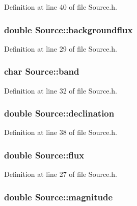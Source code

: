 Definition at line 40 of file Source.h.

\hypertarget{classSource_ac6515686d4bbb766ae14e1360fdf1c97}{
\subsubsection[{backgroundflux}]{\setlength{\rightskip}{0pt plus 5cm}double {\bf Source::backgroundflux}}}
\label{classSource_ac6515686d4bbb766ae14e1360fdf1c97}


Definition at line 29 of file Source.h.

\hypertarget{classSource_a380447fc2b80c1b6bc5c2a8b31ed6b98}{
\subsubsection[{band}]{\setlength{\rightskip}{0pt plus 5cm}char {\bf Source::band}}}
\label{classSource_a380447fc2b80c1b6bc5c2a8b31ed6b98}


Definition at line 32 of file Source.h.

\hypertarget{classSource_acd65dbd79034b6bd27ce7bea9cddf80b}{
\subsubsection[{declination}]{\setlength{\rightskip}{0pt plus 5cm}double {\bf Source::declination}}}
\label{classSource_acd65dbd79034b6bd27ce7bea9cddf80b}


Definition at line 38 of file Source.h.

\hypertarget{classSource_a8888be0016028aa59006fa6d9fc7c575}{
\subsubsection[{flux}]{\setlength{\rightskip}{0pt plus 5cm}double {\bf Source::flux}}}
\label{classSource_a8888be0016028aa59006fa6d9fc7c575}


Definition at line 27 of file Source.h.

\hypertarget{classSource_a6a63845ae2495f7d0b9758e969ae34a5}{
\subsubsection[{magnitude}]{\setlength{\rightskip}{0pt plus 5cm}double {\bf Source::magnitude}}}
\label{classSource_a6a63845ae2495f7d0b9758e969ae34a5}


